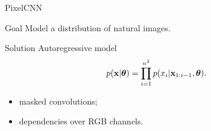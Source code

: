 \begin{frame}{PixelCNN}
\begin{block}{Goal}
Model a distribution of natural images.
\end{block}
\begin{block}{Solution}
Autoregressive model
\[
    p(\mathbf{x} | \boldsymbol{\theta}) = \prod_{i=1}^{n^2} p(x_i|\mathbf{x}_{1:i-1}, \boldsymbol{\theta}).
\]
\begin{itemize}
    \item masked convolutions;
    \item dependencies over RGB channels.
\end{itemize}
\end{block}
\end{frame}
